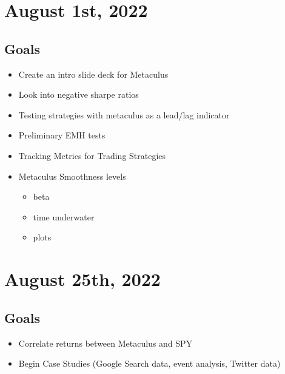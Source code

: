 \documentclass{article}
\begin{document}
\section{August 1st, 2022}
\subsection*{Goals}
\begin{itemize}
    \item Create an intro slide deck for Metaculus
    \item Look into negative sharpe ratios
    \item Testing strategies with metaculus as a lead/lag indicator
    \item Preliminary EMH tests
    \item Tracking Metrics for Trading Strategies
    \item Metaculus Smoothness levels
    \begin{itemize}
        \item beta
        \item time underwater
        \item plots
    \end{itemize}

\end{itemize}

\section{August 25th, 2022}
\subsection*{Goals}
\begin{itemize}
    \item Correlate returns between Metaculus and SPY
    \item Begin Case Studies (Google Search data, event analysis, Twitter data)
\end{itemize}
\end{document}
